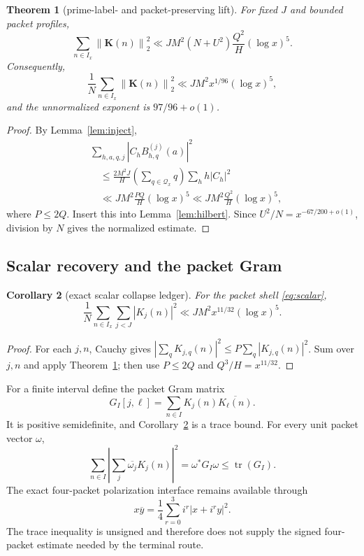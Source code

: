 \documentclass[11pt]{article}
\newtheorem{theorem}{Theorem}[section]
\newtheorem{corollary}[theorem]{Corollary}
\theoremstyle{remark}
\newcommand{\Qx}{\mathcal Q_x}
\newcommand{\Kvec}{\mathbf K}
\newcommand{\Kj}{K_j}
\newcommand{\Kjq}{K_{j,q}}
\newcommand{\Kell}{K_\ell}
\newcommand{\norm}[1]{\left\lVert #1\right\rVert}
\begin{document}
\begin{theorem}[prime-label- and packet-preserving lift]
\label{thm:split}
For fixed $J$ and bounded packet profiles,
\[
 \sum_{n\in I_x}\norm{\Kvec(n)}_2^2
 \ll J M^2(N+U^2)\frac{Q^2}{H}(\log x)^5.
 \label{eq:split-bound}
\]
Consequently,
\[
 \frac1N\sum_{n\in I_x}\norm{\Kvec(n)}_2^2
 \ll J M^2x^{1/96}(\log x)^5,
 \label{eq:split-normalized}
\]
and the unnormalized exponent is $97/96+o(1)$.
\end{theorem}

\begin{proof}
By Lemma~\ref{lem:inject},
\[
\begin{aligned}
 &\sum_{h,a,q,j}|C_hB_{h,q}^{(j)}(a)|^2\\
 &\quad\leq
 \frac{2M^2J}{H}\left(\sum_{q\in\Qx}q\right)
 \sum_hh|C_h|^2\\
 &\quad\ll J M^2\frac{P Q}{H}(\log x)^5
 \ll J M^2\frac{Q^2}{H}(\log x)^5,
\end{aligned}
\]
where $P\leq2Q$.  Insert this into Lemma~\ref{lem:hilbert}.  Since
$U^2/N=x^{-67/200+o(1)}$, division by $N$ gives the normalized estimate.
\end{proof}

\subsection{Scalar recovery and the packet Gram}

\begin{corollary}[exact scalar collapse ledger]
\label{cor:scalar}
For the packet shell \eqref{eq:scalar},
\begin{equation}
 \frac1N\sum_{n\in I_x}\sum_{j<J}|\Kj(n)|^2
 \ll J M^2x^{11/32}(\log x)^5.
 \label{eq:scalar-bound}
\end{equation}
\end{corollary}

\begin{proof}
For each $j,n$, Cauchy gives
$|\sum_q\Kjq(n)|^2\leq P\sum_q|\Kjq(n)|^2$.  Sum over $j,n$ and
apply Theorem~\ref{thm:split}; then use $P\leq2Q$ and
$Q^3/H=x^{11/32}$.
\end{proof}

For a finite interval define the packet Gram matrix
\begin{equation}
 G_I[j,\ell]=\sum_{n\in I}\Kj(n)\overline{\Kell(n)}.
\label{eq:gram-definition}
\end{equation}
It is positive semidefinite, and Corollary~\ref{cor:scalar} is a trace bound.
For every unit packet vector $\omega$,
\begin{equation}
 \sum_{n\in I}\left|\sum_j\overline{\omega_j}\Kj(n)\right|^2
 =\omega^*G_I\omega\leq\operatorname{tr}(G_I).
 \label{eq:gram}
\end{equation}
The exact four-packet polarization interface remains available through
\begin{equation}
 x\overline y=\frac14\sum_{r=0}^{3}i^r|x+i^ry|^2.
 \label{eq:polarization}
\end{equation}
The trace inequality is unsigned and therefore does not supply the signed
four-packet estimate needed by the terminal route.
\end{document}
